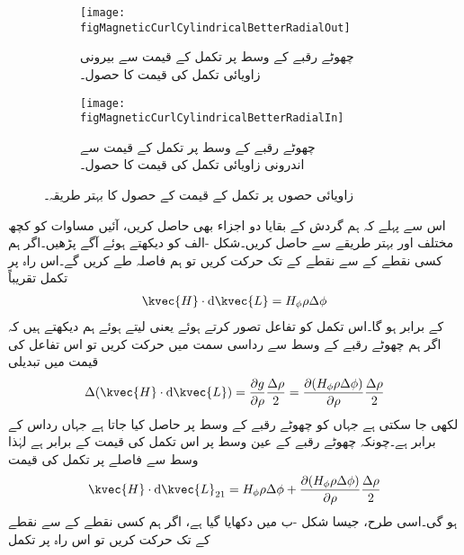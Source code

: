 \begin{figure}
\centering
\begin{subfigure}{0.5\textwidth}
\centering
\texttt{[image: figMagneticCurlCylindricalBetterRadialOut]}
\caption{چھوٹے رقبے کے وسط پر تکمل کے قیمت سے بیرونی\\ زاویائی تکمل کی قیمت کا حصول۔}
\end{subfigure}
%
\begin{subfigure}{0.5\textwidth}
\centering
\texttt{[image: figMagneticCurlCylindricalBetterRadialIn]}
\caption{چھوٹے رقبے کے وسط پر تکمل کے قیمت سے\\ اندرونی زاویائی تکمل کی قیمت کا حصول۔}
\end{subfigure}%
\caption{زاویائی حصوں پر تکمل کے قیمت کے حصول کا بہتر طریقہ۔}
\label{شکل_مقناطیسی_بہتر_گردش_نلکی}
\end{figure}
اس سے پہلے کہ ہم گردش کے بقایا دو اجزاء بھی حاصل کریں، آئیں مساوات  کو کچھ مختلف اور بہتر طریقے سے حاصل کریں۔شکل -الف کو دیکھتے ہوئے آگے پڑھیں۔اگر ہم کسی نقطے  کے   سے نقطے کے  تک حرکت کریں تو ہم   فاصلہ طے کریں گے۔اس راہ پر تکمل تقریباً
\begin{align*}
\kvec{H} \cdot \dif \kvec{L}=H_{\phi}\rho \Delta \phi
\end{align*}
 کے برابر ہو گا۔اس تکمل کو تفاعل  تصور کرتے ہوئے  یعنی  لیتے ہوئے  ہم دیکھتے ہیں کہ اگر ہم چھوٹے رقبے کے وسط سے رداسی سمت میں   حرکت کریں تو اس تفاعل کی قیمت میں تبدیلی
\begin{align*}
\Delta (\kvec{H} \cdot \dif \kvec{L})=\frac{\partial g}{\partial \rho}\frac{\Delta \rho}{2}=\frac{\partial (H_{\phi}\rho \Delta \phi)}{\partial \rho} \frac{\Delta \rho}{2}
\end{align*}
لکھی جا سکتی ہے جہاں  کو چھوٹے رقبے کے وسط پر حاصل کیا جاتا ہے جہاں رداس  کے برابر ہے۔چونکہ چھوٹے رقبے کے عین وسط پر اس تکمل کی قیمت  کے برابر ہے لہٰذا وسط سے  فاصلے پر تکمل کی قیمت
\begin{align}\label{مساوات_مقناطیسی_نلکی_ایک_دو}
\kvec{H} \cdot \dif \kvec{L}_{21}=H_{\phi}\rho \Delta \phi+\frac{\partial (H_{\phi}\rho \Delta \phi)}{\partial \rho} \frac{\Delta \rho}{2}
\end{align}
ہو گی۔اسی طرح، جیسا شکل -ب میں دکھایا گیا ہے، اگر ہم کسی نقطے کے   سے نقطے کے   تک حرکت کریں تو اس راہ پر تکمل
